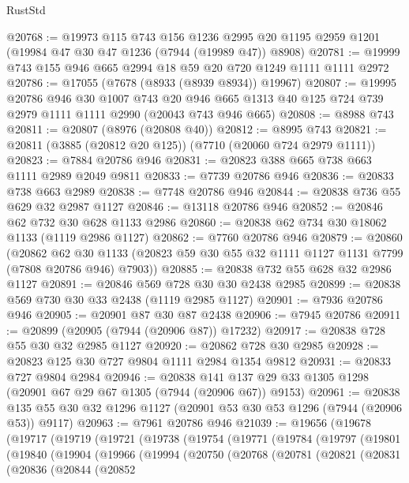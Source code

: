 \begin{lexlean}{RustStd}
\begin{coremodule}
@20768 := @19973
    @115
    @743
    @156
    @1236
    @2995
    @20
    @1195
    @2959
    @1201
    (@19984 @47 @30 @47 @1236 (@7944 (@19989 @47)) @8908)
@20781 := @19999 @743 @155 @946 @665 @2994 @18 @59 @20 @720 @1249 @1111 @1111 @2972
@20786 := @17055 (@7678 (@8933 (@8939 @8934)) @19967)
@20807 := @19995
    @20786
    @946
    @30
    @1007
    @743
    @20
    @946
    @665
    @1313
    @40
    @125
    @724
    @739
    @2979
    @1111
    @1111
    @2990
    (@20043 @743 @946 @665)
@20808 := @8988 @743
@20811 := @20807 (@8976 (@20808 @40))
@20812 := @8995 @743
@20821 := @20811 (@3885 (@20812 @20 @125)) (@7710 (@20060 @724 @2979 @1111))
@20823 := @7884 @20786 @946
@20831 := @20823 @388 @665 @738 @663 @1111 @2989 @2049 @9811
@20833 := @7739 @20786 @946
@20836 := @20833 @738 @663 @2989
@20838 := @7748 @20786 @946
@20844 := @20838 @736 @55 @629 @32 @2987 @1127
@20846 := @13118 @20786 @946
@20852 := @20846 @62 @732 @30 @628 @1133 @2986
@20860 := @20838 @62 @734 @30 @18062 @1133 (@1119 @2986 @1127)
@20862 := @7760 @20786 @946
@20879 := @20860
    (@20862
      @62
      @30
      @1133
      (@20823 @59 @30 @55 @32 @1111 @1127 @1131 @7799 (@7808 @20786 @946) @7903))
@20885 := @20838 @732 @55 @628 @32 @2986 @1127
@20891 := @20846 @569 @728 @30 @30 @2438 @2985
@20899 := @20838 @569 @730 @30 @33 @2438 (@1119 @2985 @1127)
@20901 := @7936 @20786 @946
@20905 := @20901 @87 @30 @87 @2438
@20906 := @7945 @20786
@20911 := @20899 (@20905 (@7944 (@20906 @87)) @17232)
@20917 := @20838 @728 @55 @30 @32 @2985 @1127
@20920 := @20862 @728 @30 @2985
@20928 := @20823 @125 @30 @727 @9804 @1111 @2984 @1354 @9812
@20931 := @20833 @727 @9804 @2984
@20946 := @20838 @141 @137 @29 @33 @1305 @1298 (@20901 @67 @29 @67 @1305 (@7944 (@20906 @67)) @9153)
@20961 := @20838 @135 @55 @30 @32 @1296 @1127 (@20901 @53 @30 @53 @1296 (@7944 (@20906 @53)) @9117)
@20963 := @7961 @20786 @946
@21039 := @19656
    (@19678
      (@19717
        (@19719
          (@19721
            (@19738
              (@19754
                (@19771
                  (@19784
                    (@19797
                      (@19801
                        (@19840
                          (@19904
                            (@19966
                              (@19994
                                (@20750
                                  (@20768
                                    (@20781
                                      (@20821
                                        (@20831
                                          (@20836
                                            (@20844
                                              (@20852

\end{coremodule}
\end{lexlean}
